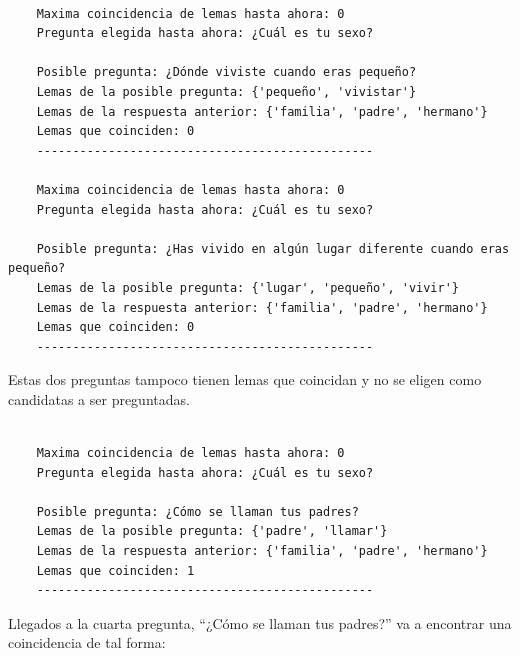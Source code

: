 \begin{verbatim}

	Maxima coincidencia de lemas hasta ahora: 0
	Pregunta elegida hasta ahora: ¿Cuál es tu sexo?
	
	Posible pregunta: ¿Dónde viviste cuando eras pequeño?
	Lemas de la posible pregunta: {'pequeño', 'vivistar'}
	Lemas de la respuesta anterior: {'familia', 'padre', 'hermano'}
	Lemas que coinciden: 0
	-----------------------------------------------
	
	Maxima coincidencia de lemas hasta ahora: 0
	Pregunta elegida hasta ahora: ¿Cuál es tu sexo?
	
	Posible pregunta: ¿Has vivido en algún lugar diferente cuando eras pequeño?
	Lemas de la posible pregunta: {'lugar', 'pequeño', 'vivir'}
	Lemas de la respuesta anterior: {'familia', 'padre', 'hermano'}
	Lemas que coinciden: 0
	-----------------------------------------------

\end{verbatim}

Estas dos preguntas tampoco tienen lemas que coincidan y no se eligen como candidatas a ser preguntadas.

\begin{verbatim}	
	
	Maxima coincidencia de lemas hasta ahora: 0
	Pregunta elegida hasta ahora: ¿Cuál es tu sexo?
	
	Posible pregunta: ¿Cómo se llaman tus padres?
	Lemas de la posible pregunta: {'padre', 'llamar'}
	Lemas de la respuesta anterior: {'familia', 'padre', 'hermano'}
	Lemas que coinciden: 1
	-----------------------------------------------
\end{verbatim}



Llegados a la cuarta pregunta, ``¿Cómo se llaman tus padres?'' va a encontrar una coincidencia de tal forma:

